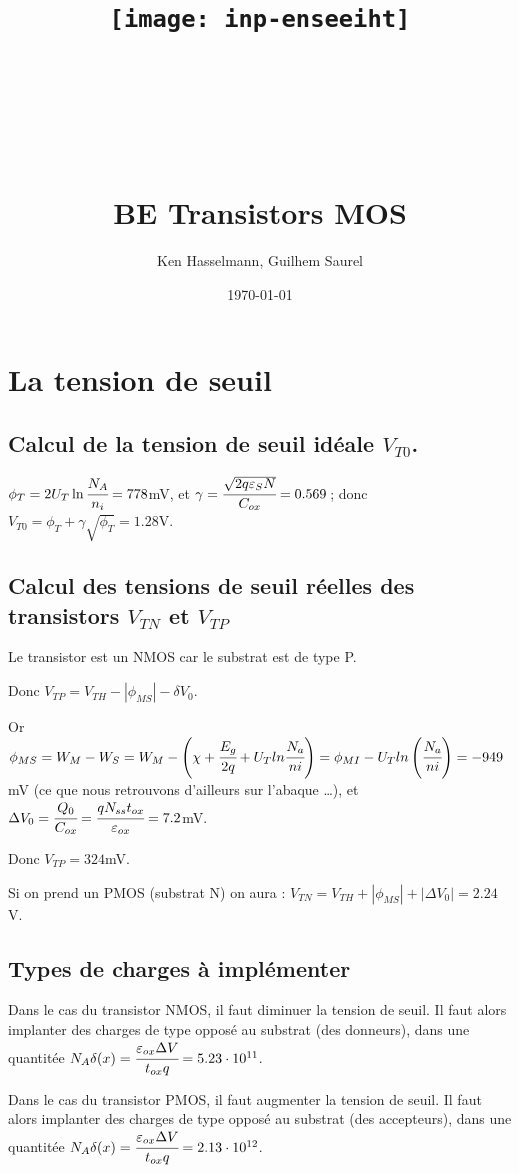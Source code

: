 \documentclass[10pt]{article}
\title{\texttt{[image: inp-enseeiht]} \\ ~ \\ ~ \\ ~ \\ ~ \\ BE Transistors MOS}
\author{Ken Hasselmann, Guilhem Saurel}
\date{\today}
\begin{document}
 \begin{titlepage}
  \maketitle
  \tableofcontents
 \end{titlepage}

 \section{La tension de seuil}
  \subsection{Calcul de la tension de seuil idéale $V_{T0}$.}
   $\phi_T = 2 U_T \ln\cfrac{N_A}{n_i} = 778$mV,
   et $\gamma = \cfrac{\sqrt{2q\varepsilon_SN}}{C_{ox}} = 0.569$\,;
   donc $V_{T0} = \phi_T + \gamma\sqrt{\phi_T} = 1.28$V.

  \subsection{Calcul des tensions de seuil réelles des transistors $V_{TN}$ et $V_{TP}$}
   Le transistor est un NMOS car le substrat est de type P.
   
   Donc  $V_{TP} = V_{TH} - |\phi_{MS}| - \delta{V_0}$. %

   
   Or $\phi_{MS} = W_M - W_S = W_M - \left(\chi + \cfrac{E_g}{2q} + U_T ln \cfrac{N_a}{ni} \right) = \phi_{MI} - U_T ln \left(\cfrac{N_a}{ni}\right) = -949$mV (ce que nous retrouvons d’ailleurs sur l’abaque …),
   et $\Delta V_0 = \cfrac{Q_0}{C_{ox}} = \cfrac{q N_{ss} t_{ox}}{\varepsilon_{ox}} = 7.2$mV.
   
   Donc $V_{TP} = 324$mV.
      
   Si on prend un PMOS (substrat N) on aura :
   $V_{TN} = V_{TH} + |\phi_{MS}| + |\Delta{V_0}| = 2.24$V.

  \subsection{Types de charges à implémenter}
  Dans le cas du transistor NMOS, il faut diminuer la tension de seuil. 
  Il faut alors implanter des charges de type opposé au substrat (des donneurs),
  dans une quantitée 
  $N_A \delta(x) = \cfrac{\varepsilon_{ox} \Delta V}{t_{ox} q} = 5.23\cdot 10^{11}$.

  Dans le cas du transistor PMOS, il faut augmenter la tension de seuil. 
  Il faut alors implanter des charges de type opposé au substrat (des accepteurs),
  dans une quantitée  
  $N_A \delta(x) = \cfrac{\varepsilon_{ox} \Delta V}{t_{ox} q} = 2.13\cdot 10^{12}$.
  
\end{document}
